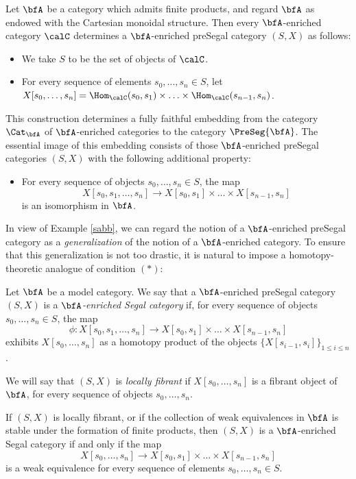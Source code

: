 \begin{example}\label{sabb}
Let $\bfA$ be a category which admits finite products, and regard
$\bfA$ as endowed with the Cartesian monoidal structure. Then
every $\bfA$-enriched category $\calC$ determines a 
$\bfA$-enriched preSegal category $(S,X)$ as follows:
\begin{itemize}
\item We take $S$ to be the set of objects of $\calC$.
\item For every sequence of elements $s_0, \ldots, s_n \in S$, let
$X[ s_0, \ldots, s_n ] = \Hom_{\calC}(s_0, s_1) \times \ldots
\times \Hom_{\calC}(s_{n-1}, s_n)$.
\end{itemize}
This construction determines a fully faithful embedding from
the category $\Cat_{\bfA}$ of $\bfA$-enriched categories to the
category $\PreSeg{\bfA}$. The essential image of this embedding
consists of those $\bfA$-enriched preSegal categories
$(S,X)$ with the following additional property:
\begin{itemize}
\item[$(\ast)$] For
every sequence of objects $s_0, \ldots, s_n \in S$, the
map
$$ X[s_0, s_1, \ldots, s_n] \rightarrow X[s_0, s_1] \times \ldots \times X[s_{n-1},s_n]$$
is an isomorphism in $\bfA$.
\end{itemize}
\end{example}

In view of Example \ref{sabb}, we can regard the notion of a $\bfA$-enriched preSegal
category as a {\it generalization} of the notion of a $\bfA$-enriched category. To ensure that
this generalization is not too drastic, it is natural to impose a homotopy-theoretic analogue of condition $(\ast)$:

\begin{definition}\label{calhoun}
Let $\bfA$ be a model category. We say that a $\bfA$-enriched preSegal category
$(S,X)$ is a {\it $\bfA$-enriched Segal category} if, for every sequence of objects
$s_0, \ldots, s_n \in S$, the map
$$ \phi: X[s_0, s_1, \ldots, s_n] \rightarrow X[s_0, s_1] \times \ldots \times X[s_{n-1},s_n]$$
exhibits $X[ s_0, \ldots, s_n]$ as a homotopy product of the objects
$\{ X[s_{i-1}, s_i ] \}_{1 \leq i \leq n}$. 

We will say that $(S,X)$ is {\it locally fibrant} if $X[s_0, \ldots, s_n]$ is
a fibrant object of $\bfA$, for every sequence of objects $s_0, \ldots, s_n$.
\end{definition}

\begin{remark}
If $(S,X)$ is locally fibrant, or if the collection of weak equivalences in $\bfA$ is
stable under the formation of finite products, then $(S,X)$ is a $\bfA$-enriched
Segal category if and only if the map
$$X[s_0, \ldots, s_n] \rightarrow X[s_0, s_1] \times \ldots \times X[s_{n-1}, s_n]$$
is a weak equivalence for every sequence of elements $s_0, \ldots, s_n \in S$.
\end{remark}

